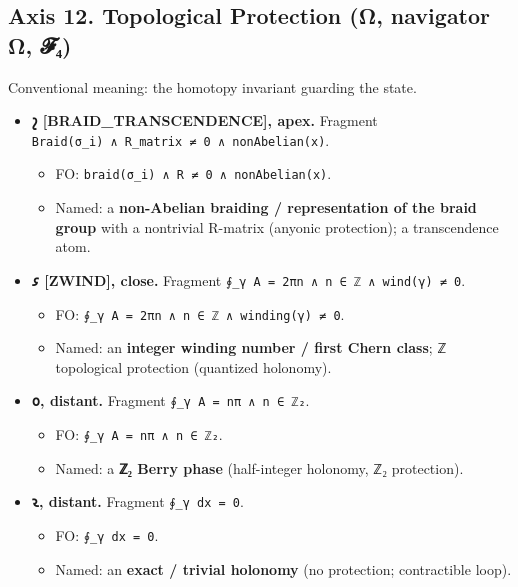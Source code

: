 \hypertarget{axis-12.-topological-protection-ux3c9-navigator-ux3c9-ux1d4d5ux2084}{%
\subsection{Axis 12. Topological Protection (Ω, navigator Ω,
𝓕₄)}\label{axis-12.-topological-protection-ux3c9-navigator-ux3c9-ux1d4d5ux2084}}

Conventional meaning: the homotopy invariant guarding the state.

\begin{itemize}
\tightlist
\item
  \textbf{𐑟 {[}BRAID\_TRANSCENDENCE{]}, apex.} Fragment
  \texttt{Braid(σ\_i)\ ∧\ R\_matrix\ ≠\ 0\ ∧\ nonAbelian(x)}.

  \begin{itemize}
  \tightlist
  \item
    FO: \texttt{braid(σ\_i)\ ∧\ R\ ≠\ 0\ ∧\ nonAbelian(x)}.
  \item
    Named: a \textbf{non-Abelian braiding / representation of the braid
    group} with a nontrivial R-matrix (anyonic protection); a
    transcendence atom.
  \end{itemize}
\item
  \textbf{𐑭 {[}ZWIND{]}, close.} Fragment
  \texttt{∮\_γ\ A\ =\ 2πn\ ∧\ n\ ∈\ ℤ\ ∧\ wind(γ)\ ≠\ 0}.

  \begin{itemize}
  \tightlist
  \item
    FO: \texttt{∮\_γ\ A\ =\ 2πn\ ∧\ n\ ∈\ ℤ\ ∧\ winding(γ)\ ≠\ 0}.
  \item
    Named: an \textbf{integer winding number / first Chern class}; ℤ
    topological protection (quantized holonomy).
  \end{itemize}
\item
  \textbf{𐑴, distant.} Fragment \texttt{∮\_γ\ A\ =\ nπ\ ∧\ n\ ∈\ ℤ₂}.

  \begin{itemize}
  \tightlist
  \item
    FO: \texttt{∮\_γ\ A\ =\ nπ\ ∧\ n\ ∈\ ℤ₂}.
  \item
    Named: a \textbf{ℤ₂ Berry phase} (half-integer holonomy, ℤ₂
    protection).
  \end{itemize}
\item
  \textbf{𐑷, distant.} Fragment \texttt{∮\_γ\ dx\ =\ 0}.

  \begin{itemize}
  \tightlist
  \item
    FO: \texttt{∮\_γ\ dx\ =\ 0}.
  \item
    Named: an \textbf{exact / trivial holonomy} (no protection;
    contractible loop).
  \end{itemize}
\end{itemize}

